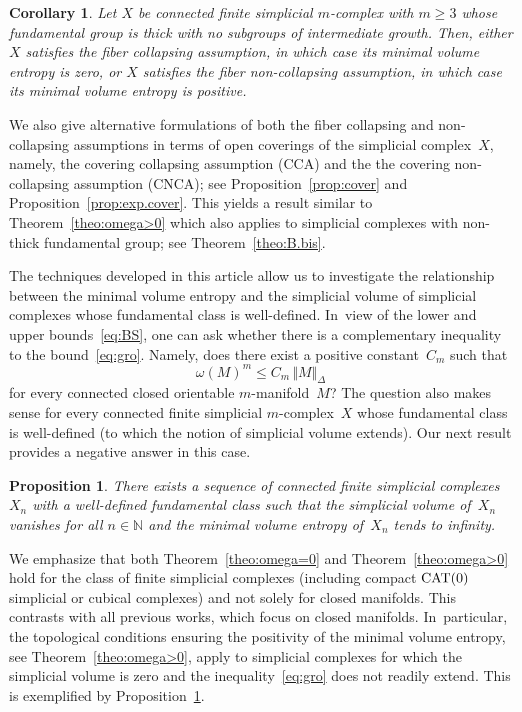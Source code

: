 \documentclass[10pt]{amsart}
\newtheorem{proposition}[theorem]{Proposition}
\newtheorem{corollary}[theorem]{Corollary}
\theoremstyle{definition}
\newcommand\N{{\mathbb N}}
\begin{document}
\begin{corollary}
Let $X$ be connected finite simplicial $m$\nobreakdash-complex with $m \geq 3$ whose fundamental group is thick with no subgroups of intermediate growth.
Then, either $X$ satisfies the fiber collapsing assumption, in which case its minimal volume entropy is zero, or $X$ satisfies the fiber non-collapsing assumption, in which case its minimal volume entropy is positive.
\end{corollary}

We also give alternative formulations of both the fiber collapsing and non-collapsing assumptions in terms of open coverings of the simplicial complex~$X$, namely, the covering collapsing assumption (CCA) and the the covering non-collapsing assumption (CNCA); see Proposition~\ref{prop:cover} and Proposition~\ref{prop:exp.cover}.
This yields a result similar to Theorem~\ref{theo:omega>0} which also applies to simplicial complexes with non-thick fundamental group; see Theorem~\ref{theo:B.bis}.

The techniques developed in this article allow us to investigate the relationship between the minimal volume entropy and the simplicial volume of simplicial complexes whose fundamental class is well-defined. In~view of the lower and upper bounds~\eqref{eq:BS}, one can ask whether there is a complementary inequality to the bound~\eqref{eq:gro}.
Namely, does there exist a positive constant~$C_m$ such that
\[
\omega(M)^m \leq C_m \, \Vert M \Vert_\Delta
\]
for every connected closed orientable $m$\nobreakdash-manifold~$M$?
The question also makes sense for every connected finite simplicial $m$\nobreakdash-complex~$X$ whose fundamental class is well-defined (to which the notion of simplicial volume extends).
Our next result provides a negative answer in this case.

\begin{proposition} \label{prop:ex}
There exists a sequence of connected finite simplicial complexes~$X_n$ with a well-defined fundamental class such that the simplicial volume of~$X_n$ vanishes for all $n \in \N$ and the minimal volume entropy of~$X_n$ tends to infinity.
\end{proposition}

We emphasize that both Theorem~\ref{theo:omega=0} and Theorem~\ref{theo:omega>0} hold for the class of finite simplicial complexes (including compact ${\rm CAT}(0)$ simplicial or cubical complexes) and not solely for closed manifolds.
This contrasts with all previous works, which focus on closed manifolds. In~particular, the topological conditions ensuring the positivity of the minimal volume entropy, see Theorem~\ref{theo:omega>0}, apply to simplicial complexes for which the simplicial volume is zero and the inequality~\eqref{eq:gro} does not readily extend.
This is exemplified by Proposition~\ref{prop:ex}.
\end{document}
